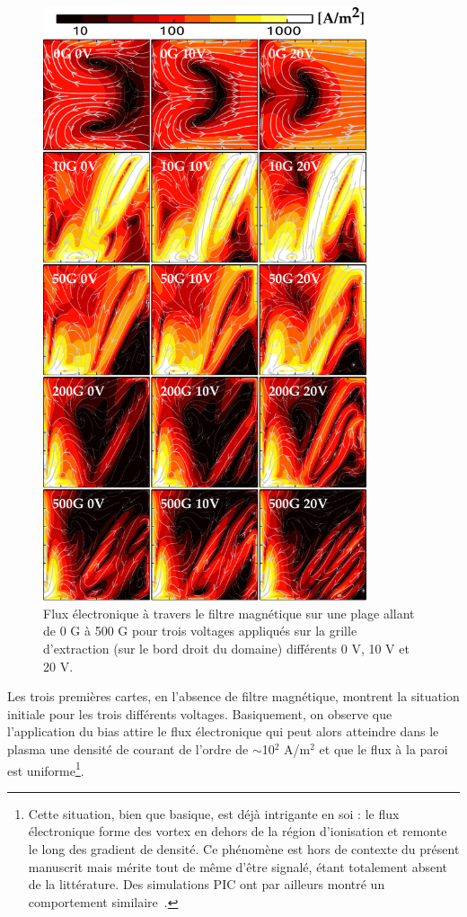 \begin{refsection}
 \begin{figure}[!htbp]
	\centering
	\includegraphics[width=0.85\textwidth]{figures/4-pegasesfluxElectronique.pdf}
	{\caption{Flux électronique à travers le filtre magnétique sur une plage
	allant de 0 G à 500 G pour trois voltages appliqués sur la grille
	d'extraction (sur le bord droit du domaine) différents 0 V, 10 V et 20 V.}
	\label{4-pegasesfluxElectronique}}
	\end{figure}

Les trois premières cartes, en l'absence de filtre magnétique, montrent la
situation initiale pour les trois différents voltages. Basiquement, on observe
que l'application du bias attire le flux électronique qui peut alors atteindre
dans le plasma une densité de courant de l'ordre de $\sim$10$^2$ A/m$^2$ et que
le flux à la paroi est uniforme\footnote{Cette
situation, bien que basique, est déjà intrigante en soi : le flux électronique
forme des vortex en dehors de la région d'ionisation et remonte le long des
gradient de densité. Ce phénomène est hors de contexte du présent
manuscrit mais mérite tout de même d'être signalé, étant totalement absent de
la littérature.
Des simulations PIC ont par ailleurs montré un comportement
similaire~\parencite{PIC3D}.}.


\end{refsection}
